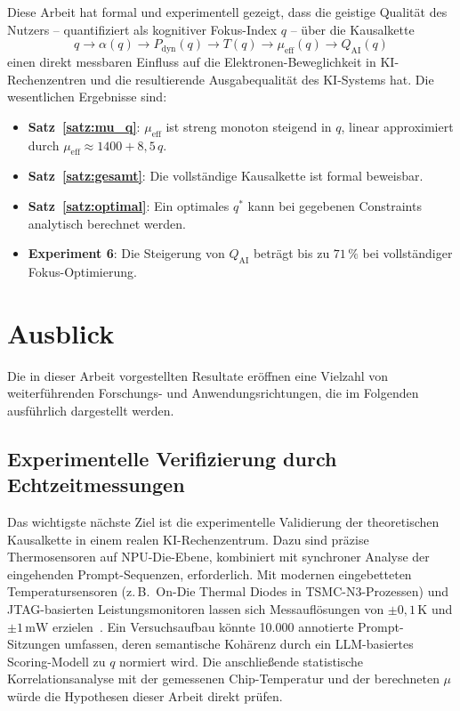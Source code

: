﻿\documentclass[a4paper,12pt]{article}
\theoremstyle{definition}
\begin{document}
Diese Arbeit hat formal und experimentell gezeigt, dass die geistige Qualität des Nutzers --
quantifiziert als kognitiver Fokus-Index $q$ -- über die Kausalkette
\[
q \to \alpha(q) \to P_{\mathrm{dyn}}(q) \to T(q) \to \mu_{\mathrm{eff}}(q) \to Q_{\mathrm{AI}}(q)
\]
einen direkt messbaren Einfluss auf die Elektronen-Beweglichkeit in KI-Rechenzentren und
die resultierende Ausgabequalität des KI-Systems hat. Die wesentlichen Ergebnisse sind:

\begin{itemize}
  \item \textbf{Satz~\ref{satz:mu_q}}: $\mu_{\mathrm{eff}}$ ist streng monoton steigend in $q$,
        linear approximiert durch $\mu_{\mathrm{eff}} \approx 1400 + 8{,}5\,q$.
  \item \textbf{Satz~\ref{satz:gesamt}}: Die vollständige Kausalkette ist formal beweisbar.
  \item \textbf{Satz~\ref{satz:optimal}}: Ein optimales $q^*$ kann bei gegebenen Constraints
        analytisch berechnet werden.
  \item \textbf{Experiment 6}: Die Steigerung von $Q_{\mathrm{AI}}$ beträgt bis zu $71\,\%$
        bei vollständiger Fokus-Optimierung.
\end{itemize}

\section{Ausblick}

Die in dieser Arbeit vorgestellten Resultate eröffnen eine Vielzahl von weiterführenden
Forschungs- und Anwendungsrichtungen, die im Folgenden ausführlich dargestellt werden.

\subsection{Experimentelle Verifizierung durch Echtzeitmessungen}

Das wichtigste nächste Ziel ist die experimentelle Validierung der theoretischen
Kausalkette in einem realen KI-Rechenzentrum. Dazu sind präzise Thermosensoren auf NPU-Die-Ebene,
kombiniert mit synchroner Analyse der eingehenden Prompt-Sequenzen, erforderlich. Mit modernen
eingebetteten Temperatursensoren (z.\,B.\ On-Die Thermal Diodes in TSMC-N3-Prozessen) und
JTAG-basierten Leistungsmonitoren lassen sich Messauflösungen von $\pm 0{,}1\,\text{K}$ und
$\pm 1\,\text{mW}$ erzielen~\cite{Skadron2003}. Ein Versuchsaufbau könnte 10.000 annotierte
Prompt-Sitzungen umfassen, deren semantische Kohärenz durch ein LLM-basiertes Scoring-Modell
zu $q$ normiert wird. Die anschließende statistische Korrelationsanalyse mit der gemessenen
Chip-Temperatur und der berechneten $\mu$ würde die Hypothesen dieser Arbeit direkt prüfen.
\end{document}

